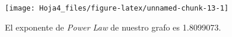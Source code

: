 \documentclass[
]{article}
\newenvironment{Shaded}{\begin{snugshade}}{\end{snugshade}}
\newcommand{\CommentTok}[1]{\textcolor[rgb]{0.56,0.35,0.01}{\textit{#1}}}
\newcommand{\DataTypeTok}[1]{\textcolor[rgb]{0.13,0.29,0.53}{#1}}
\newcommand{\KeywordTok}[1]{\textcolor[rgb]{0.13,0.29,0.53}{\textbf{#1}}}
\newcommand{\NormalTok}[1]{#1}
\newcommand{\OperatorTok}[1]{\textcolor[rgb]{0.81,0.36,0.00}{\textbf{#1}}}
\newcommand{\StringTok}[1]{\textcolor[rgb]{0.31,0.60,0.02}{#1}}
\begin{document}
\begin{center}\texttt{[image: Hoja4\_files/figure-latex/unnamed-chunk-13-1]} \end{center}

\begin{Shaded}
\end{Shaded}

El exponente de \emph{Power Law} de nuestro grafo es 1.8099073.
\end{document}
